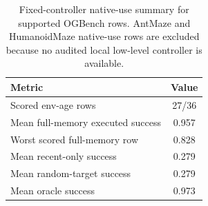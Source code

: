 \begin{table}[H]
\centering
\footnotesize
\caption{Fixed-controller native-use summary for supported OGBench rows. AntMaze and HumanoidMaze native-use rows are excluded because no audited local low-level controller is available.}
\label{tab:native-use}
\begin{tabular}{lc}
\toprule
Metric & Value\\
\midrule
Scored env-age rows & 27/36\\
Mean full-memory executed success & 0.957\\
Worst scored full-memory row & 0.828\\
Mean recent-only success & 0.279\\
Mean random-target success & 0.279\\
Mean oracle success & 0.973\\
\bottomrule
\end{tabular}
\end{table}
